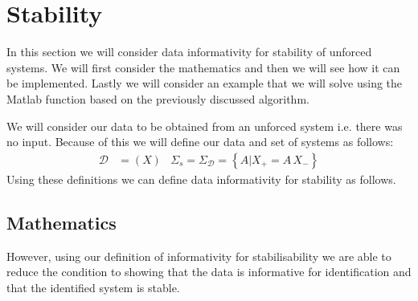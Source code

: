 \section{Stability}
In this section we will consider data informativity for stability of unforced systems. We will first consider the mathematics and then we will see how it can be implemented. Lastly we will consider an example that we will solve using the Matlab function based on the previously discussed algorithm.

We will consider our data to be obtained from an unforced system i.e. there was no input. Because of this we will define our data and set of systems as follows:
\begin{align*}
\mathcal{D} &= (X) & \Sigma_s = \Sigma_\mathcal{D} = \left\{ A | X_+ = A \, X_- \right\}
\end{align*}
Using these definitions we can define data informativity for stability as follows.



\subsection{Mathematics}
However, using our definition of informativity for stabilisability we are able to reduce the condition to showing that the data is informative for identification and that the identified system is stable.



